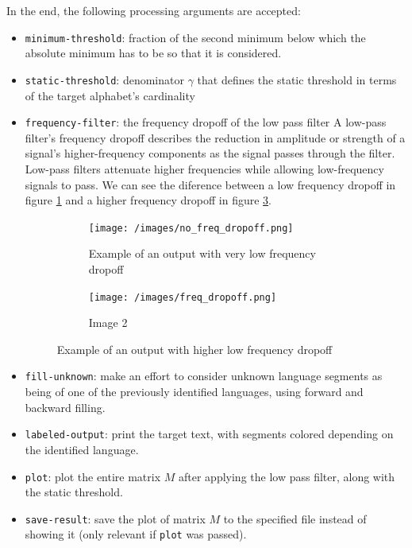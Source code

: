 \documentclass{article}
\begin{document}
In the end, the following processing arguments are accepted:
\begin{itemize}
    \item \verb|minimum-threshold|: fraction of the second minimum below which the absolute minimum has to be so that it is considered.
    \item \verb|static-threshold|: denominator $\gamma$ that defines the static threshold in terms of the target alphabet's cardinality
    \item \verb|frequency-filter|: the frequency dropoff of the low pass filter
    A low-pass filter's frequency dropoff describes the reduction in amplitude or strength of a signal's higher-frequency components as the signal passes through the filter. 
    Low-pass filters attenuate higher frequencies while allowing low-frequency signals to pass. 
    We can see the diference between a low frequency dropoff in figure \ref{fig:no_freq_dropoff} and a higher frequency dropoff in figure \ref{fig:freq_dropoff}.


    \begin{figure}
        \centering
        \begin{subfigure}[b]{0.4\textwidth}
            \centering
            \texttt{[image: /images/no\_freq\_dropoff.png]}
            \caption{Example of an output with very low frequency dropoff}
            \label{fig:no_freq_dropoff}
        \end{subfigure}
        \hfill
        \begin{subfigure}[b]{0.4\textwidth}
            \centering
            \texttt{[image: /images/freq\_dropoff.png]}
            \caption{Image 2}
            \label{fig:image2}
        \end{subfigure}
        \caption{Example of an output with higher low frequency dropoff}
        \label{fig:freq_dropoff}
    \end{figure}


    \item \verb|fill-unknown|: make an effort to consider unknown language segments as being of one of the previously identified languages, using forward and backward filling.
    \item \verb|labeled-output|: print the target text, with segments colored depending on the identified language.
    \item \verb|plot|: plot the entire matrix $M$ after applying the low pass filter, along with the static threshold.
    \item \verb|save-result|: save the plot of matrix $M$ to the specified file instead of showing it (only relevant if \verb|plot| was passed).
\end{itemize}
\end{document}
